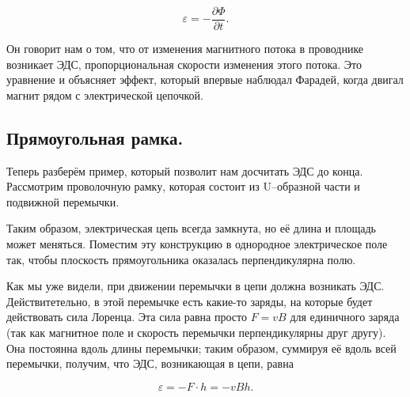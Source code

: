 \documentclass[a4paper,12pt]{article}
\numberwithin{equation}{section}
\newcommand{\pt}{\partial}
\newcommand{\vareps}{\varepsilon}
\begin{document}
\begin{equation}
  \label{eq:eds_5}
  \vareps = - \frac{\pt \Phi}{\pt t}.
\end{equation}

Он говорит нам о том, что от изменения магнитного потока в проводнике
возникает ЭДС, пропорциональная скорости изменения этого потока. Это
уравнение и объясняет эффект, который впервые наблюдал Фарадей, когда
двигал магнит рядом с электрической цепочкой. 

\subsection{Прямоугольная рамка.}
\label{sec:rectangle}

Теперь разберём пример, который позволит нам досчитать ЭДС до
конца. Рассмотрим проволочную рамку, которая состоит из U--образной
части и подвижной перемычки. 

\begin{figure}[h]
  \centering
  \label{fig:rect_b_field}
\end{figure}

Таким образом, электрическая цепь всегда замкнута, но её длина и
площадь может меняться. Поместим эту конструкцию в однородное
электрическое поле так, чтобы плоскость прямоугольника оказалась
перпендикулярна полю. 

Как мы уже видели, при движении перемычки в цепи должна возникать
ЭДС. Действитетельно, в этой перемычке есть какие-то заряды, на
которые будет действовать сила Лоренца. Эта сила равна просто $F = vB$
для единичного заряда (так как магнитное поле и скорость перемычки
перпендикулярны друг другу). Она постоянна вдоль длины перемычки;
таким образом, суммируя её вдоль всей перемычки, получим, что ЭДС,
возникающая в цепи, равна

\begin{equation}
  \label{eq:rect_eds_1}
  \vareps = - F \cdot h = - v B h.
\end{equation}
\end{document}
